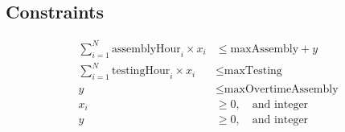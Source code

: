 \documentclass{article}
\begin{document}
\subsection*{Constraints}
\begin{align*}
\sum_{i=1}^{N} \text{assemblyHour}_i \times x_i & \leq \text{maxAssembly} + y \\
\sum_{i=1}^{N} \text{testingHour}_i \times x_i & \leq \text{maxTesting} \\
y & \leq \text{maxOvertimeAssembly} \\
x_i & \geq 0, \quad \text{and integer} \\
y & \geq 0, \quad \text{and integer}
\end{align*}
\end{document}

